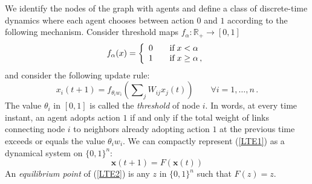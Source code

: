 \documentclass[12pt,twoside,reqno]{amsart}
\theoremstyle{definition}
\numberwithin{equation}{section}
\newcommand{\be}{\begin{equation}}
\newcommand{\ee}{\end{equation}}
\newcommand{\mc}{\mathcal}
\newcommand{\0}{\mathbf{0}}
\newcommand{\1}{\mathbf{1}}
\newcommand{\x}{\mathbf{x}}
\newcommand{\R}{\mathbb{R}}
\newcommand{\thre}{\theta}
\begin{document}
We identify the nodes of the graph with agents and define a class of discrete-time dynamics where each agent chooses between action $0$ and $1$ according to the following mechanism. Consider threshold maps $f_{\alpha}:\R_+\to [0,1]$
$$f_{\alpha}(x)=\left\{\begin{array}{ll} 0\quad &\hbox{if}\; x<\alpha\\ 1\quad &\hbox{if}\; x\geq \alpha\,, \end{array}\right.$$
and consider the following update rule:
\be\label{LTE1}x_i(t+1)=f_{\thre_iw_i}\left(\sum\nolimits_{j}W_{ij}x_j(t)\right)\qquad \forall i=1,\ldots,n\,.\ee
The value $\thre_i$ in $[0,1]$ is called the \emph{threshold} of node $i$. In words, at every time instant, an agent adopts action $1$ if and only if the total weight of links connecting node $i$ to neighbors already adopting action $1$ at the previous time exceeds or equals the value $\thre_iw_i$. We can compactly represent (\ref{LTE1}) as a dynamical system on $\{0,1\}^{n}$:
\be\label{LTE2}\x(t+1)=F(\x(t))\ee
An \emph{equilibrium point} of (\ref{LTE2}) is any $z$ in $\{0,1\}^{n}$ such that $F(z)=z$.
\end{document}

